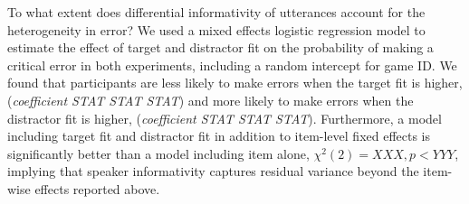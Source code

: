 \documentclass[manuscript]{stjour}
\begin{document}
To what extent does differential informativity of utterances account for the heterogeneity in error? %
We used a mixed effects logistic regression model to estimate the effect of target and distractor fit on the probability of making a critical error in both experiments, including a random intercept for game ID. We found that participants are less likely to make errors when the target fit is higher, (\emph{coefficient STAT STAT STAT}) and more likely to make errors when the distractor fit is higher, (\emph{coefficient STAT STAT STAT}). Furthermore, a model including target fit and distractor fit in addition to item-level fixed effects is significantly better than a model including item alone, $\chi^2(2) = XXX, p < YYY$, implying that speaker informativity captures residual variance beyond the item-wise effects reported above.



\end{document}
